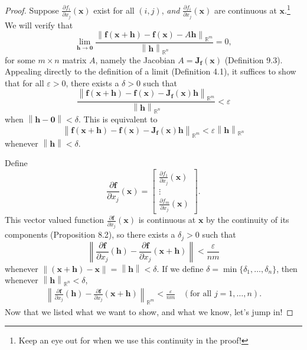 \documentclass{article}
\newcommand{\R}{\mathbb{R}}
\newcommand{\x}{\mathbf{x}}
\newcommand{\f}{\mathbf{f}}
\newcommand{\h}{\mathbf{h}}
\newcommand{\ze}{\mathbf{0}}
\newcommand{\norm}[1]{\left\lVert#1\right\rVert}
\theoremstyle{definition}
\begin{document}
	\begin{proof}
		
		
		Suppose $\frac{\partial f_i}{\partial x_j}(\x) $ exist for all $ (i,j) $, \textit{and} $ \frac{\partial f_i}{\partial x_j}(\x) $ are continuous at $ \x $.\footnote{Keep an eye out for when we use this continuity in the proof!} We will verify that
		$$	\lim\limits_{\mathbf h\to \ze}\frac{\norm{\f(\x+\mathbf h) - \f(\x)-A\mathbf{h}}_{\R^m}}{\norm{\mathbf h}_{\R^n}} = 0,$$ for some $ m\times n $ matrix $ A $, namely the Jacobian $ A=\mathbf{J}_\f(\x) $ (Definition 9.3). Appealing directly to the definition of a limit (Definition 4.1), it suffices to show that for all $ \varepsilon > 0 $, there exists a $\delta >0$ such that $$ \frac{\norm{\f(\x+\mathbf h) - \f(\x)-\mathbf{J}_\f(\x) \mathbf{h}}_{\R^m}}{\norm{\mathbf h}_{\R^n}} < \varepsilon$$ when $\norm{\mathbf h - \ze} < \delta $. This is equivalent to\begin{equation}\label{key}
			\norm{\f(\x+\mathbf h) - \f(\x)-\mathbf{J}_\f(\x) \mathbf{h}}_{\R^m} < \varepsilon\norm{\mathbf h}_{\R^n}
		\end{equation} whenever $\norm{\mathbf h} < \delta $.
		
		Define $$ \frac{\partial \f}{\partial x_j}(\x) = \begin{bmatrix}
			\frac{\partial f_1}{\partial x_j}(\x) \\ \vdots \\ 
			\frac{\partial f_m}{\partial x_j}(\x) 
		\end{bmatrix}.$$ This vector valued function $  \frac{\partial \f}{\partial x_j}(\x)  $ is continuous at $ \x $ by the continuity of its components (Proposition 8.2), so there exists a $ \delta_j>0 $ such that $$\norm{ \frac{\partial \f}{\partial x_j}(\h) - \frac{\partial \f}{\partial x_j}(\x+\h) } < \frac{\varepsilon}{nm}$$ whenever $ \norm{(\x + \h)-\x} =\norm{\h} < \delta $. If we define $ \delta = \min\{\delta_1,\ldots, \delta_n\} $, then whenever  $\norm{\h}_{\R^n} < \delta $, 
		\begin{align}
			\norm{ \frac{\partial \f}{\partial x_j}(\h) - \frac{\partial \f}{\partial x_j}(\x+\h) }_{\R^m} < \frac{\varepsilon}{nm}  \ \ \ \  (\text{for all } j=1,\ldots,n).
		\end{align}
		Now that we listed what we want to show, and what we know, let's jump in!
		

\end{proof}
\end{document}
